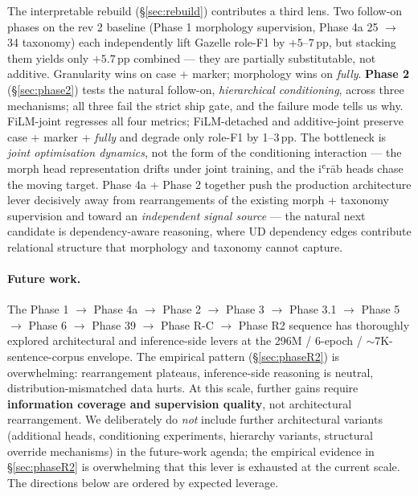 \documentclass[10pt,a4paper,twocolumn]{article}
\begin{document}
The interpretable rebuild (\S\ref{sec:rebuild}) contributes a third lens. Two follow-on phases on the rev 2 baseline (Phase 1 morphology supervision, Phase 4a 25 $\rightarrow$ 34 taxonomy) each independently lift Gazelle role-F1 by $+5$--$7$\,pp, but stacking them yields only $+5.7$\,pp combined --- they are partially substitutable, not additive. Granularity wins on case + marker; morphology wins on \emph{fully}. \textbf{Phase 2} (\S\ref{sec:phase2}) tests the natural follow-on, \emph{hierarchical conditioning}, across three mechanisms; all three fail the strict ship gate, and the failure mode tells us why. FiLM-joint regresses all four metrics; FiLM-detached and additive-joint preserve case + marker + \emph{fully} and degrade only role-F1 by 1--3\,pp. The bottleneck is \emph{joint optimisation dynamics}, not the form of the conditioning interaction --- the morph head representation drifts under joint training, and the iʿrāb heads chase the moving target. Phase 4a + Phase 2 together push the production architecture lever decisively away from rearrangements of the existing morph + taxonomy supervision and toward an \emph{independent signal source} --- the natural next candidate is dependency-aware reasoning, where UD dependency edges contribute relational structure that morphology and taxonomy cannot capture.

\paragraph{Future work.}
\label{sec:future}
The Phase 1 $\rightarrow$ Phase 4a $\rightarrow$ Phase 2 $\rightarrow$ Phase 3 $\rightarrow$ Phase 3.1 $\rightarrow$ Phase 5 $\rightarrow$ Phase 6 $\rightarrow$ Phase 39 $\rightarrow$ Phase R-C $\rightarrow$ Phase R2 sequence has thoroughly explored architectural and inference-side levers at the 296M / 6-epoch / $\sim$7K-sentence-corpus envelope. The empirical pattern (\S\ref{sec:phaseR2}) is overwhelming: rearrangement plateaus, inference-side reasoning is neutral, distribution-mismatched data hurts. At this scale, further gains require \textbf{information coverage and supervision quality}, not architectural rearrangement. We deliberately do \emph{not} include further architectural variants (additional heads, conditioning experiments, hierarchy variants, structural override mechanisms) in the future-work agenda; the empirical evidence in \S\ref{sec:phaseR2} is overwhelming that this lever is exhausted at the current scale. The directions below are ordered by expected leverage.
\end{document}
